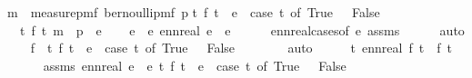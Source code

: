 \begin{isabellebody}
{\isachardoublequoteopen}m\ {\isacharequal}{\kern0pt}\ measure{\isacharunderscore}{\kern0pt}pmf\ {\isacharparenleft}{\kern0pt}bernoulli{\isacharunderscore}{\kern0pt}pmf\ p{}{\isacharparenright}{\kern0pt}{\isachardoublequoteclose}\isanewline
{\isachardoublequoteopen}{\isasymAnd}t{\isachardot}{\kern0pt}\ f\ t\ {\isacharequal}{\kern0pt}\ e\ {\isacharasterisk}{\kern0pt}\ {\isacharparenleft}{\kern0pt}case\ t\ of\ True\ {\isasymRightarrow}\ {}{\isacharbar}{\kern0pt}\ False\ {\isasymRightarrow}\ {}{\isacharparenright}{\kern0pt}{\isachardoublequoteclose}\isanewline
{}\ {\isachardoublequoteopen}{\isasymintegral}\isactrlsup {\isacharplus}{\kern0pt}\ t{\isachardot}{\kern0pt}\ {\isacharparenleft}{\kern0pt}f\ t{\isacharparenright}{\kern0pt}\ {\isasympartial}m\ {\isacharequal}{\kern0pt}\ p{}\ {\isacharasterisk}{\kern0pt}\ e{\isachardoublequoteclose}\isanewline
%
\isadelimproof
%
\endisadelimproof
%
\isatagproof
{}\isamarkupfalse%
{\isacharminus}{\kern0pt}\isanewline
\ \ \isamarkupfalse%
\ e{}\ \ {\isachardoublequoteopen}e{}{\isasymge}{}{\isachardoublequoteclose}\ {\isachardoublequoteopen}ennreal\ e{}\ {\isacharequal}{\kern0pt}\ e{\isachardoublequoteclose}\isanewline
\ \ \ \ \isamarkupfalse%
\ ennreal{\isacharunderscore}{\kern0pt}cases{\isacharbrackleft}{\kern0pt}of\ e{\isacharbrackright}{\kern0pt}\ assms{\isacharparenleft}{\kern0pt}{}{\isacharparenright}{\kern0pt}\isanewline
\ \ \ \ \isamarkupfalse%
\ auto\isanewline
\ \ \isamarkupfalse%
\ f{}\ \ {\isachardoublequoteopen}{\isasymAnd}t{\isachardot}{\kern0pt}\ f{}\ t\ {\isacharequal}{\kern0pt}\ e{}\ {\isacharasterisk}{\kern0pt}\ {\isacharparenleft}{\kern0pt}case\ t\ of\ True\ {\isasymRightarrow}\ {}{\isacharbar}{\kern0pt}\ False\ {\isasymRightarrow}\ {}{\isacharparenright}{\kern0pt}{\isachardoublequoteclose}\isanewline
\ \ \ \ \isamarkupfalse%
\ auto\isanewline
\ \ \isamarkupfalse%
\ \isamarkupfalse%
\ {\isachardoublequoteopen}{\isasymAnd}t{\isachardot}{\kern0pt}\ ennreal\ {\isacharparenleft}{\kern0pt}f{}\ t{\isacharparenright}{\kern0pt}\ {\isacharequal}{\kern0pt}\ f\ t{\isachardoublequoteclose}\isanewline
\ \ \ \ \isamarkupfalse%
\ assms{\isacharparenleft}{\kern0pt}{}{\isacharparenright}{\kern0pt}\ {\isacartoucheopen}ennreal\ e{}\ {\isacharequal}{\kern0pt}\ e{\isacartoucheclose}\ {\isacartoucheopen}{\isasymAnd}t{\isachardot}{\kern0pt}\ f{}\ t\ {\isacharequal}{\kern0pt}\ e{}\ {\isacharasterisk}{\kern0pt}\ {\isacharparenleft}{\kern0pt}case\ t\ of\ True\ {\isasymRightarrow}\ {}{\isacharbar}{\kern0pt}\ False\ {\isasymRightarrow}\ {}{\isacharparenright}{\kern0pt}{\isacartoucheclose}\isanewline

\end{isabellebody}
